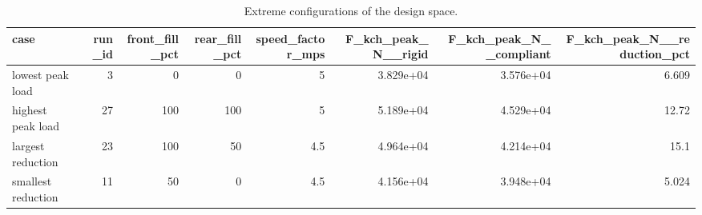 \begin{table}
\caption{Extreme configurations of the design space.}
\label{tab:table11_extremes}
\begin{tabular}{lrrrrrrr}
\toprule
case & run\_id & front\_fill\_pct & rear\_fill\_pct & speed\_factor\_mps & F\_kch\_peak\_N\_\_rigid & F\_kch\_peak\_N\_\_compliant & F\_kch\_peak\_N\_\_reduction\_pct \\
\midrule
lowest peak load & 3 & 0 & 0 & 5 & 3.829e+04 & 3.576e+04 & 6.609 \\
highest peak load & 27 & 100 & 100 & 5 & 5.189e+04 & 4.529e+04 & 12.72 \\
largest reduction & 23 & 100 & 50 & 4.5 & 4.964e+04 & 4.214e+04 & 15.1 \\
smallest reduction & 11 & 50 & 0 & 4.5 & 4.156e+04 & 3.948e+04 & 5.024 \\
\bottomrule
\end{tabular}
\end{table}
